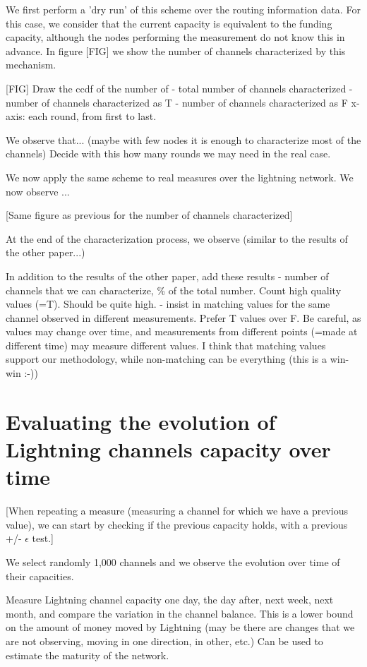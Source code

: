 We first perform a 'dry run' of this scheme over the routing information data. For this case, we consider that the current capacity is equivalent to the funding capacity, although the nodes performing the measurement do not know this in advance. 
In figure [FIG] we show the number of channels characterized by this mechanism. 

[FIG] 
Draw the ccdf of the number of 
- total number of channels characterized
- number of  channels characterized as T
- number of channels characterized as F
x-axis: each round, from first to last.

We observe that... (maybe with few nodes it is enough to characterize most of the channels)
Decide with this how many rounds we may need in the real case.

We now apply the same scheme to real measures over the lightning network. 
We now observe ...

[Same figure as previous for the number of channels characterized]

At the end of the characterization process, we observe (similar to the results of the other paper...)

In addition to the results of the other paper, add these results
- number of channels that we can characterize, \% of the total number. Count high quality values (=T). Should be quite high.
- insist in matching values for the same channel observed in different measurements. Prefer T values over F. Be careful, as values may change over time, and measurements from different points (=made at different time) may measure different values.
I think that matching values support our methodology, while non-matching can be everything (this is a win-win :-))

\section{Evaluating the evolution of Lightning channels capacity over time}
[When repeating a measure (measuring a channel for which we have a previous value), we can start by checking if the previous capacity holds, with a previous +/- $\epsilon$ test.]

We select randomly 1,000 channels and we observe the evolution over time of their capacities. 

Measure Lightning channel capacity one day, the day after, next week, next month, and compare the variation in the channel balance. 
This is a lower bound on the amount of money moved by Lightning (may be there are changes that we are not observing, moving in one direction, in other, etc.) 
Can be used to estimate the maturity of the network.

